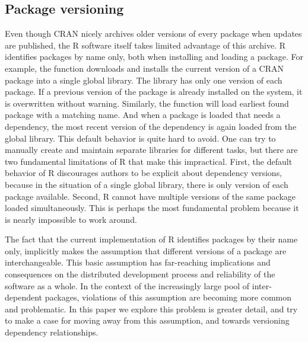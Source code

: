 
\subsection{Package versioning}

Even though CRAN nicely archives older versions of every package when updates
are published, the R software itself takes limited advantage of this archive.
R identifies packages by name only, both when installing and loading a package.
For example, the  function downloads and installs the
current version of a CRAN package into a single global library. The library has
only one version of each package. If a previous version of the package is
already installed on the system, it is overwritten without warning. Similarly,
the  function will load earliest found package with a matching
name. And when a package is loaded that needs a dependency, the most recent
version of the dependency is again loaded from the global library. This default
behavior is quite hard to avoid. One can try to manually create and maintain
separate libraries for different tasks, but there are two fundamental
limitations of R that make this impractical. First, the default behavior of R
discourages authors to be explicit about dependency versions, because in the
situation of a single global library, there is only version of each package available.
Second, R cannot have multiple versions of the same package loaded
simultaneously. This is perhaps the most fundamental problem because it is
nearly impossible to work around.

The fact that the current implementation of R identifies packages by their name
only, implicitly makes the assumption that different versions of a package are
interchangeable. This basic assumption has far-reaching implications and
consequences on the distributed development process and reliability of the
software as a whole. In the context of the increasingly large pool of
inter-dependent packages, violations of this assumption are becoming more
common and problematic. In this paper we explore this problem is greater
detail, and try to make a case for moving away from this assumption, and towards
versioning dependency relationships.

